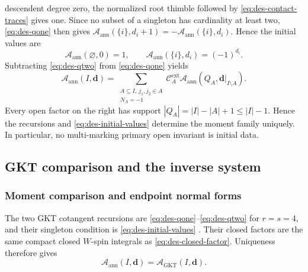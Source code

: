 descendent degree zero, the normalized root thimble followed by
\eqref{eq:des-contact-traces} gives one.  Since no subset of a singleton has
cardinality at least two, \eqref{eq:des-qone} then gives
$\mathcal A_{\mathrm{ann}}(\{i\},d_i+1)
=-\mathcal A_{\mathrm{ann}}(\{i\},d_i)$.  Hence the initial values are
\begin{equation}
 \mathcal A_{\mathrm{ann}}(\varnothing,0)=1,
 \qquad \mathcal A_{\mathrm{ann}}(\{i\},d_i)=(-1)^{d_i}.
 \label{eq:des-initial-values}
\end{equation}
Subtracting \eqref{eq:des-qtwo} from \eqref{eq:des-qone} yields
\begin{equation}
 \mathcal A_{\mathrm{ann}}(I,\mathbf d)
 =\sum_{\substack{A\subseteq I,\ j_1,j_2\in A\\N_A=-1}}
 \mathcal C_A^{\mathrm{ext}}
 \mathcal A_{\mathrm{ann}}(Q_A,\mathbf d|_{I\setminus A}).
 \label{eq:des-support-reduction}
\end{equation}
Every open factor on the right has support
$|Q_A|=|I|-|A|+1\leq|I|-1$.  Hence the recursions and
\eqref{eq:des-initial-values} determine the moment family uniquely.  In
particular, no multi-marking primary open invariant is initial data.

\subsection{GKT comparison and the inverse system}

\subsubsection{Moment comparison and endpoint normal forms}

The two GKT cotangent recursions
\cite[Thm.~5.10]{grossetal2022open} are
\eqref{eq:des-qone}--\eqref{eq:des-qtwo} for $r=s=4$, and their singleton
condition is \eqref{eq:des-initial-values}
\cite[Cor.~5.11(1)]{grossetal2022open}.  Their closed factors are the same
compact closed $W$-spin integrals as \eqref{eq:des-closed-factor}.  Uniqueness
therefore gives
\begin{equation}
 \mathcal A_{\mathrm{ann}}(I,\mathbf d)
 =\mathcal A_{\mathrm{GKT}}(I,\mathbf d).
 \label{eq:des-moment-comparison}
\end{equation}

